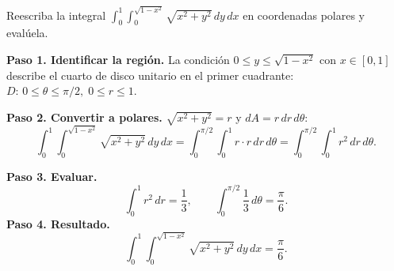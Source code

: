 \begin{prob}
Reescriba la integral \(\displaystyle \int_0^1\int_0^{\sqrt{1-x^2}} \sqrt{x^2+y^2}\,dy\,dx\) en coordenadas polares y evalúela.
\begin{myproof}
\textbf{Paso 1. Identificar la región.} La condición $0\le y\le\sqrt{1-x^2}$ con $x\in[0,1]$ describe el cuarto de disco unitario en el primer cuadrante: $D:\,0\le\theta\le\pi/2,\;0\le r\le1$.

\textbf{Paso 2. Convertir a polares.} $\sqrt{x^2+y^2}=r$ y $dA=r\,dr\,d\theta$:
\[
\int_0^1\int_0^{\sqrt{1-x^2}}\sqrt{x^2+y^2}\,dy\,dx
=\int_0^{\pi/2}\int_0^1 r\cdot r\,dr\,d\theta
=\int_0^{\pi/2}\int_0^1 r^2\,dr\,d\theta.
\]

\textbf{Paso 3. Evaluar.}
\[
\int_0^1 r^2\,dr=\frac{1}{3},\qquad
\int_0^{\pi/2}\frac{1}{3}\,d\theta=\frac{\pi}{6}.
\]
\textbf{Paso 4. Resultado.}
\[
\boxed{\int_0^1\int_0^{\sqrt{1-x^2}}\sqrt{x^2+y^2}\,dy\,dx=\frac{\pi}{6}.}
\]
\end{myproof}
\end{prob}

